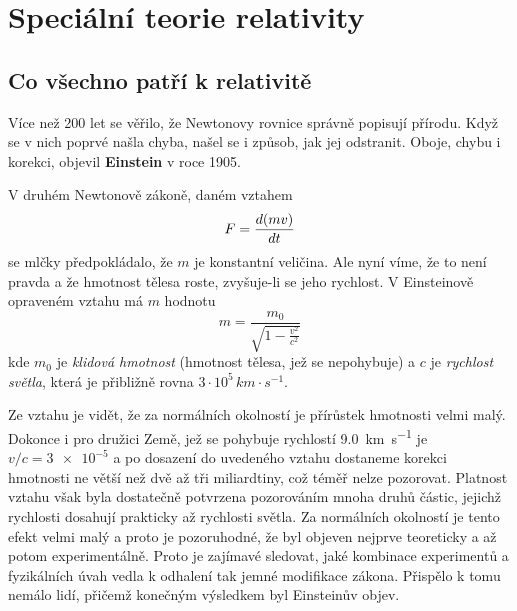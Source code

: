 \setchaptertoc
\chapter{Speciální teorie relativity}\label{fyz:IchapXV}
  \section{Co všechno patří k relativitě}\label{fyz:IchapXVsecI}
    Více než \num{200} let se věřilo, že Newtonovy rovnice správně popisují přírodu. Když se v nich 
    poprvé našla chyba, našel se i způsob, jak jej odstranit. Oboje, chybu i korekci, objevil 
    \textbf{Einstein} v roce \num{1905}.
    
    V druhém Newtonově zákoně, daném vztahem 
    \begin{equation*}
      F = \dfrac{d (mv)}{d t}
    \end{equation*}
    se mlčky předpokládalo, že \(m\) je konstantní veličina. Ale nyní víme, že to není pravda a že 
    hmotnost tělesa roste, zvyšuje-li se jeho rychlost. V Einsteinově opraveném vztahu má \(m\) 
    hodnotu
    \begin{equation}\label{fyz:eq182}
      m = \frac{m_0}{\sqrt{1-\frac{v^2}{c^2}}}
    \end{equation}  
    kde \(m_0\) je \emph{klidová hmotnost} (hmotnost tělesa, jež se nepohybuje) a $c$ je 
    \emph{rychlost světla}, která je přibližně rovna $3\cdot10^5\, km\cdot s^{-1}$.
    
    Ze vztahu je vidět, že za normálních okolností je přírůstek hmotnosti velmi malý. Dokonce i pro 
    družici Země, jež se pohybuje rychlostí \SI{9.0}{\km\per\s} je \(v/c = \num{3e-5}\) a po 
    dosazení do uvedeného vztahu dostaneme korekci hmotnosti ne větší než dvě až tři miliardtiny, 
    což téměř nelze pozorovat. Platnost vztahu však byla dostatečně potvrzena pozorováním mnoha 
    druhů částic, jejichž rychlosti dosahují prakticky až rychlosti světla. Za normálních okolností 
    je tento efekt velmi malý a proto je pozoruhodné, že byl objeven nejprve teoreticky a až potom 
    experimentálně. Proto je zajímavé sledovat, jaké kombinace experimentů a fyzikálních úvah vedla 
    k odhalení tak jemné modifikace zákona. Přispělo k tomu nemálo lidí, přičemž konečným výsledkem 
    byl Einsteinův objev.
    
